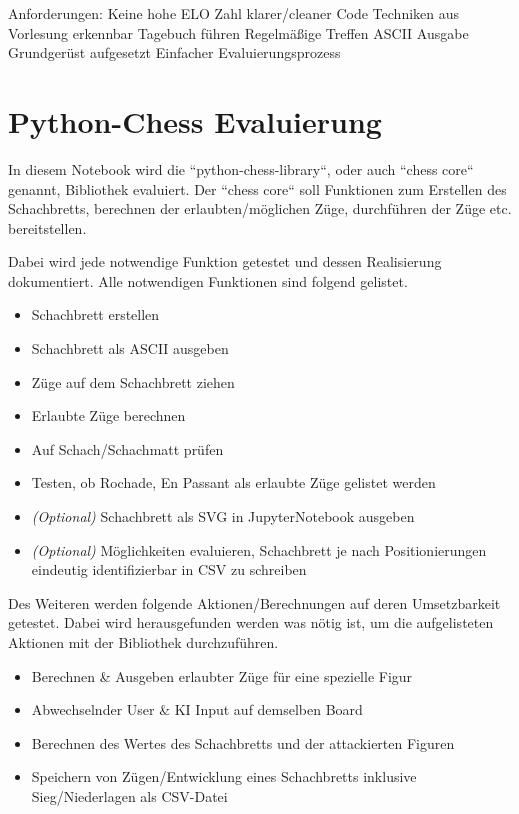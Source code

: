 Anforderungen:
	Keine hohe ELO Zahl
	klarer/cleaner Code
	Techniken aus Vorlesung erkennbar
	Tagebuch führen
	Regelmäßige Treffen
	ASCII Ausgabe
	Grundgerüst aufgesetzt
	Einfacher Evaluierungsprozess
\fi


    \section{Python-Chess Evaluierung}\label{python-chess-evaluierung}

In diesem Notebook wird die ``python-chess-library``, oder auch ``chess
core`` genannt, Bibliothek evaluiert. Der ``chess core`` soll Funktionen
zum Erstellen des Schachbretts, berechnen der erlaubten/möglichen Züge,
durchführen der Züge etc. bereitstellen.

Dabei wird jede notwendige Funktion getestet und dessen Realisierung
dokumentiert. Alle notwendigen Funktionen sind folgend gelistet.

\begin{itemize}
\tightlist
\item
  Schachbrett erstellen
\item
  Schachbrett als ASCII ausgeben
\item
  Züge auf dem Schachbrett ziehen
\item
  Erlaubte Züge berechnen
\item
  Auf Schach/Schachmatt prüfen
\item
  Testen, ob Rochade, En Passant als erlaubte Züge gelistet werden
\item
  \emph{(Optional)} Schachbrett als SVG in JupyterNotebook ausgeben
\item
  \emph{(Optional)} Möglichkeiten evaluieren, Schachbrett je nach
  Positionierungen eindeutig identifizierbar in CSV zu schreiben
\end{itemize}

Des Weiteren werden folgende Aktionen/Berechnungen auf deren
Umsetzbarkeit getestet. Dabei wird herausgefunden werden was nötig ist,
um die aufgelisteten Aktionen mit der Bibliothek durchzuführen.

\begin{itemize}
\tightlist
\item
  Berechnen \& Ausgeben erlaubter Züge für eine spezielle Figur
\item
  Abwechselnder User \& KI Input auf demselben Board
\item
  Berechnen des Wertes des Schachbretts und der attackierten Figuren
\item
  Speichern von Zügen/Entwicklung eines Schachbretts inklusive
  Sieg/Niederlagen als CSV-Datei
\end{itemize}

